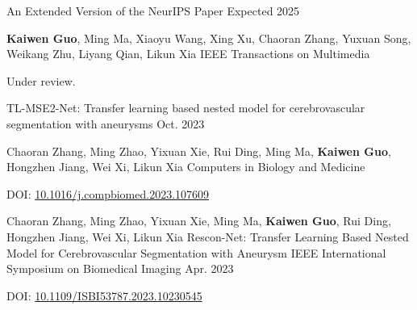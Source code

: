 





\begin{cventries}

  \cventry
  {} %
  {An Extended Version of the NeurIPS Paper} %
  {} %
  {Expected 2025} %
  {
    \begin{cvitems}
      \textbf{Kaiwen Guo}, Ming Ma, Xiaoyu Wang, Xing Xu, Chaoran Zhang, Yuxuan Song, Weikang Zhu, Liyang Qian, Likun Xia
      IEEE Transactions on Multimedia
      \item{Under review.}
    \end{cvitems}
  }

  \cventry
  {} %
  {TL-MSE2-Net: Transfer learning based nested model for cerebrovascular segmentation with aneurysms} %
  {} %
  {Oct. 2023} %
  {
    \begin{cvitems}
      Chaoran Zhang, Ming Zhao, Yixuan Xie, Rui Ding, Ming Ma, \textbf{Kaiwen Guo}, Hongzhen Jiang, Wei Xi, Likun Xia
      Computers in Biology and Medicine
      \item{DOI: \href{https://doi.org/10.1016/j.compbiomed.2023.107609}{10.1016/j.compbiomed.2023.107609}}
    \end{cvitems}
  }

  \cventry
  {Chaoran Zhang, Ming Zhao, Yixuan Xie, Ming Ma, \textbf{Kaiwen Guo}, Rui Ding, Hongzhen Jiang, Wei Xi, Likun Xia} %
  {Rescon-Net: Transfer Learning Based Nested Model for Cerebrovascular Segmentation with Aneurysm} %
  {IEEE International Symposium on Biomedical Imaging} %
  {Apr. 2023} %
  {
    \begin{cvitems}
      \item{DOI: \href{https://doi.org/10.1109/ISBI53787.2023.10230545}{10.1109/ISBI53787.2023.10230545}}
    \end{cvitems}
  }




\end{cventries}
